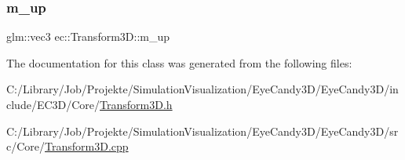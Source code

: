 \mbox{\label{classec_1_1_transform3_d_addd1132fb57befe841dfd9af94aa4329}} 
\subsubsection{\texorpdfstring{m\+\_\+up}{m\_up}}
{\footnotesize\ttfamily glm\+::vec3 ec\+::\+Transform3\+D\+::m\+\_\+up\hspace{0.3cm}{\ttfamily [protected]}}



The documentation for this class was generated from the following files\+:\begin{DoxyCompactItemize}
\item 
C\+:/\+Library/\+Job/\+Projekte/\+Simulation\+Visualization/\+Eye\+Candy3\+D/\+Eye\+Candy3\+D/include/\+E\+C3\+D/\+Core/\mbox{\hyperlink{_transform3_d_8h}{Transform3\+D.\+h}}\item 
C\+:/\+Library/\+Job/\+Projekte/\+Simulation\+Visualization/\+Eye\+Candy3\+D/\+Eye\+Candy3\+D/src/\+Core/\mbox{\hyperlink{_transform3_d_8cpp}{Transform3\+D.\+cpp}}\end{DoxyCompactItemize}
